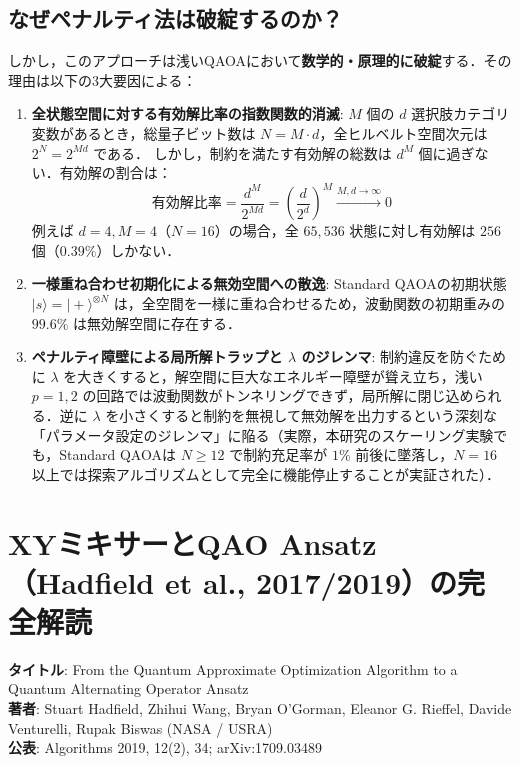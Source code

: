 \documentclass[11pt,a4paper,oneside,openany]{ltjsbook}
\theoremstyle{definition}
\theoremstyle{plain}
\theoremstyle{remark}
\newenvironment{alertbox}[1][]{\begin{cautionbox}[#1]}{\end{cautionbox}}
\newcommand{\ket}[1]{|#1\rangle}
\begin{document}
\section{なぜペナルティ法は破綻するのか？}
しかし，このアプローチは浅いQAOAにおいて\textbf{数学的・原理的に破綻}する．その理由は以下の3大要因による：

\vspace{-2mm}
\begin{alertbox}[ペナルティ法が抱える3大欠陥]
\begin{enumerate}\setlength{\itemsep}{0pt}\setlength{\parskip}{0pt}
    \item \textbf{全状態空間に対する有効解比率の指数関数的消滅}:
          $M$ 個の $d$ 選択肢カテゴリ変数があるとき，総量子ビット数は $N = M \cdot d$，全ヒルベルト空間次元は $2^N = 2^{M d}$ である．
          しかし，制約を満たす有効解の総数は $d^M$ 個に過ぎない．有効解の割合は：
          \begin{equation}
              \text{有効解比率} = \frac{d^M}{2^{Md}} = \left( \frac{d}{2^d} \right)^M \xrightarrow{M, d \to \infty} 0
          \end{equation}
          例えば $d=4, M=4$（$N=16$）の場合，全 $65,536$ 状態に対し有効解は $256$ 個（$0.39\%$）しかない．
    \item \textbf{一様重ね合わせ初期化による無効空間への散逸}:
          Standard QAOAの初期状態 $\ket{s} = \ket{+}^{\otimes N}$ は，全空間を一様に重ね合わせるため，波動関数の初期重みの $99.6\%$ は無効解空間に存在する．
    \item \textbf{ペナルティ障壁による局所解トラップと $\lambda$ のジレンマ}:
          制約違反を防ぐために $\lambda$ を大きくすると，解空間に巨大なエネルギー障壁が聳え立ち，浅い $p=1, 2$ の回路では波動関数がトンネリングできず，局所解に閉じ込められる\cite{choi2008different,hadfield2019from}．逆に $\lambda$ を小さくすると制約を無視して無効解を出力するという深刻な「パラメータ設定のジレンマ」に陥る（実際，本研究のスケーリング実験でも，Standard QAOAは $N \ge 12$ で制約充足率が $1\%$ 前後に墜落し，$N=16$ 以上では探索アルゴリズムとして完全に機能停止することが実証された）．
\end{enumerate}
\end{alertbox}

\chapter{XYミキサーとQAO Ansatz（Hadfield et al., 2017/2019）の完全解読}

\begin{paperbox}[原著論文データ]
\textbf{タイトル}: From the Quantum Approximate Optimization Algorithm to a Quantum Alternating Operator Ansatz\\
\textbf{著者}: Stuart Hadfield, Zhihui Wang, Bryan O'Gorman, Eleanor G. Rieffel, Davide Venturelli, Rupak Biswas (NASA / USRA)\\
\textbf{公表}: Algorithms 2019, 12(2), 34; arXiv:1709.03489
\end{paperbox}
\end{document}
